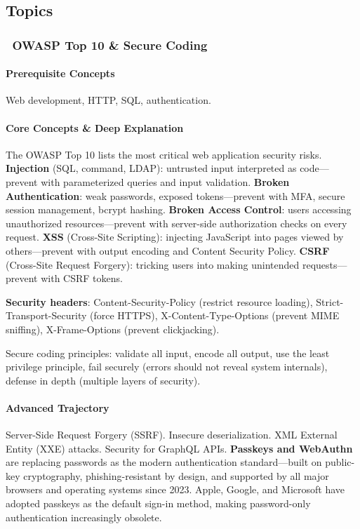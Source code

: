\documentclass[11pt, a4paper, oneside]{report}
\newcommand{\mustmaster}[1]{\subsubsection{\texorpdfstring{\fcolorbox{blue!40!black}{blue!8}{\footnotesize\bfseries\color{blue!40!black} MUST MASTER}~#1}{#1}}}
\begin{document}
\subsection*{Topics}

\mustmaster{OWASP Top 10 \& Secure Coding}

\paragraph{Prerequisite Concepts} Web development, HTTP, SQL, authentication.

\paragraph{Core Concepts \& Deep Explanation} The OWASP Top 10 lists the most critical web application security risks. \textbf{Injection} (SQL, command, LDAP): untrusted input interpreted as code---prevent with parameterized queries and input validation. \textbf{Broken Authentication}: weak passwords, exposed tokens---prevent with MFA, secure session management, bcrypt hashing. \textbf{Broken Access Control}: users accessing unauthorized resources---prevent with server-side authorization checks on every request. \textbf{XSS} (Cross-Site Scripting): injecting JavaScript into pages viewed by others---prevent with output encoding and Content Security Policy. \textbf{CSRF} (Cross-Site Request Forgery): tricking users into making unintended requests---prevent with CSRF tokens.

\textbf{Security headers}: Content-Security-Policy (restrict resource loading), Strict-Transport-Security (force HTTPS), X-Content-Type-Options (prevent MIME sniffing), X-Frame-Options (prevent clickjacking).

Secure coding principles: validate all input, encode all output, use the least privilege principle, fail securely (errors should not reveal system internals), defense in depth (multiple layers of security).

\paragraph{Advanced Trajectory} Server-Side Request Forgery (SSRF). Insecure deserialization. XML External Entity (XXE) attacks. Security for GraphQL APIs. \textbf{Passkeys and WebAuthn} are replacing passwords as the modern authentication standard---built on public-key cryptography, phishing-resistant by design, and supported by all major browsers and operating systems since 2023. Apple, Google, and Microsoft have adopted passkeys as the default sign-in method, making password-only authentication increasingly obsolete.
\end{document}
